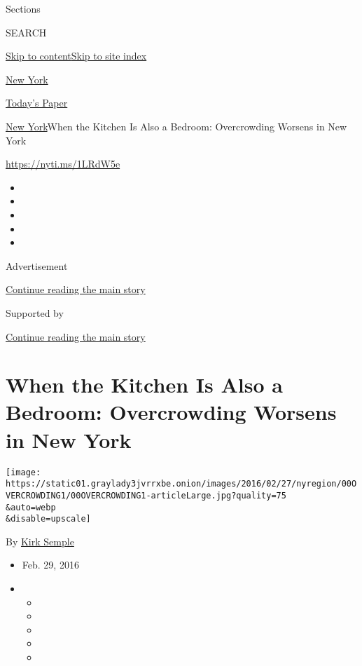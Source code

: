 Sections

SEARCH

\protect\hyperlink{site-content}{Skip to
content}\protect\hyperlink{site-index}{Skip to site index}

\href{https://www.nytimes3xbfgragh.onion/section/nyregion}{New York}

\href{https://myaccount.nytimes3xbfgragh.onion/auth/login?response_type=cookie\&client_id=vi}{}

\href{https://www.nytimes3xbfgragh.onion/section/todayspaper}{Today's
Paper}

\href{/section/nyregion}{New York}\textbar{}When the Kitchen Is Also a
Bedroom: Overcrowding Worsens in New York

\url{https://nyti.ms/1LRdW5e}

\begin{itemize}
\item
\item
\item
\item
\item
\end{itemize}

Advertisement

\protect\hyperlink{after-top}{Continue reading the main story}

Supported by

\protect\hyperlink{after-sponsor}{Continue reading the main story}

\hypertarget{when-the-kitchen-is-also-a-bedroom-overcrowding-worsens-in-new-york}{%
\section{When the Kitchen Is Also a Bedroom: Overcrowding Worsens in New
York}\label{when-the-kitchen-is-also-a-bedroom-overcrowding-worsens-in-new-york}}

\texttt{[image: https://static01.graylady3jvrrxbe.onion/images/2016/02/27/nyregion/00OVERCROWDING1/00OVERCROWDING1-articleLarge.jpg?quality=75\\\&auto=webp\\\&disable=upscale]}

By \href{http://www.nytimes3xbfgragh.onion/by/kirk-semple}{Kirk Semple}

\begin{itemize}
\item
  Feb. 29, 2016
\item
  \begin{itemize}
  \item
  \item
  \item
  \item
  \item
  \end{itemize}
\end{itemize}

